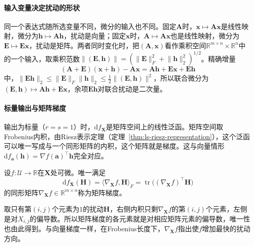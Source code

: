 \paragraph{输入变量决定扰动的形状}
同一个表达式随所选变量不同，微分的输入也不同。固定$\bm A$时，$\bm x\mapsto\bm A\bm x$是线性映射，微分为$\bm h\mapsto\bm A\bm h$，扰动是向量；固定$\bm x$时，$\bm A\mapsto\bm A\bm x$也是线性映射，微分为$\bm E\mapsto\bm E\bm x$，扰动是矩阵。两者同时变化时，把$(\bm A,\bm x)$看作乘积空间$\mathbb R^{m\times n}\times\mathbb R^n$中的一个输入，取乘积范数$\lVert(\bm E,\bm h)\rVert=(\lVert\bm E\rVert_F^2+\lVert\bm h\rVert_2^2)^{1/2}$。精确增量
\[
 (\bm A+\bm E)(\bm x+\bm h)-\bm A\bm x=\bm A\bm h+\bm E\bm x+\bm E\bm h
\]
中，$\lVert\bm E\bm h\rVert_2\leq\lVert\bm E\rVert_F\lVert\bm h\rVert_2\leq\tfrac12\lVert(\bm E,\bm h)\rVert^2$，所以联合微分为$(\bm E,\bm h)\mapsto\bm A\bm h+\bm E\bm x$，余项$\bm E\bm h$对联合扰动是二次量。

\paragraph{标量输出与矩阵梯度}
输出为标量（$r=s=1$）时，$\mathrm df_{\bm X}$是矩阵空间上的线性泛函。矩阵空间取Frobenius内积，由Riesz表示定理（定理~\ref{thm:ls-riesz-representation}），这个泛函可以唯一写成与一个同形矩阵的内积，这个矩阵就是梯度。这与向量情形$\mathrm df_{\bm a}(\bm h)=\nabla f(\bm a)^\top\bm h$完全对应。
\begin{definition}[矩阵标量函数的梯度]
\label{def:multivariable-matrix-scalar-gradient}
设$f:\mathcal U\to\mathbb R$在$\bm X$处可微。唯一满足
\begin{equation}
 \mathrm df_{\bm X}(\bm H)=\langle\nabla_{\bm X}f,\bm H\rangle_F
 =\operatorname{tr}\bigl((\nabla_{\bm X}f)^\top\bm H\bigr)
\label{eq:analysis-matrix-gradient-definition}
\end{equation}
的同形矩阵$\nabla_{\bm X}f\in\mathbb R^{m\times n}$称为矩阵梯度。
\end{definition}
取只有第$(i,j)$个元素为$1$的扰动$\bm H$，右侧内积只剩$\nabla_{\bm X}f$的第$(i,j)$个元素，左侧是对$X_{i,j}$的偏导数。所以矩阵梯度的各元素就是对相应矩阵元素的偏导数，唯一性也由此得到。与向量梯度一样，在Frobenius长度下，$\nabla_{\bm X}f$指出使$f$增加最快的扰动方向。

